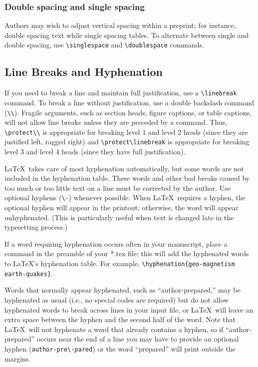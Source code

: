 \begin{article}
\subsubsection{Double spacing and single spacing}

Authors may wish to adjust vertical spacing within a 
preprint; for instance, double spacing text while 
single spacing tables.  To alternate between single 
and double spacing, use \verb"\singlespace" and 
\verb"\doublespace" commands.


\subsection{Line Breaks and Hyphenation}

If you need to break a line and maintain full justification,
use a \verb"\linebreak" command.  To break a line without
justification, use a double backslash command 
(\verb"\\").  Fragile arguments, such as section heads,
figure captions, or table captions, will not allow 
line breaks unless they are preceded by a {\tt \protect} 
command.  Thus, \verb"\protect\\" is appropriate for 
breaking level 1 and level 2 heads (since they are 
justified left, ragged right) and \verb"\protect\linebreak"
is appropriate for breaking level 3 and level 4 heads 
(since they have full justification).

\LaTeX\ takes care of most hyphenation automatically,
but some words are not included in the hyphenation table.
These words and other bad breaks caused by too much or
too little text on a line must be corrected by the author.
Use optional hyphens (\verb"\-") whenever possible.  When
\LaTeX\ requires a hyphen, the optional hyphen will appear
in the printout; otherwise, the word will appear unhyphenated.
(This is particularly useful when text is changed late in the
typesetting process.)

If a word requiring hyphenation occurs often in your 
manuscript, place a \hyphenation{} command in the 
preamble of your *.tex file; this will add the hyphenated 
words to {\LaTeX}'s hyphenation table.  For example, 
\verb"\hyphenation{geo-magnetism earth-quakes}".

Words that normally appear hyphenated, such as 
``author-prepared,'' may be hyphenated as usual 
(i.e., no special codes are required) but do 
not allow hyphenated words to break across lines in 
your input file, or \LaTeX\ will leave an extra space 
between the hyphen and the second half of the word.
Note that \LaTeX\ will not hyphenate a word that already 
contains a hyphen, so if ``author-prepared'' occurs 
near the end of a line you may have to provide an optional 
hyphen (\verb"author-pre\-pared") or the word ``prepared'' 
will print outside the margins.


\end{article}

